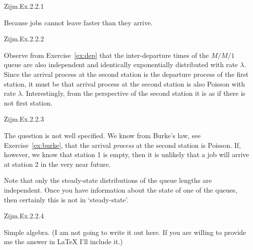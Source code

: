 \begin{exercise}
Zijm.Ex.2.2.1
\begin{solution}
Because jobs cannot leave faster than they arrive.
\end{solution}
\end{exercise}

\begin{exercise}
Zijm.Ex.2.2.2
\begin{solution}
  Observe from Exercise~\ref{ex:dep} that the inter-departure times
  of the $M/M/1$ queue are also independent and identically
  exponentially distributed with rate $\lambda$. Since the arrival
  process at the second station is the departure process of the first
  station, it must be that arrival process at the second station is
  also Poisson with rate $\lambda$.  Interestingly, from the
  perspective of the second station it is as if there is not first
  station.
\end{solution}
\end{exercise}



\begin{exercise}
Zijm.Ex.2.2.3 
\begin{solution}
  The question is not well specified. We know from Burke's law, see Exercise~\ref{ex:burke}, that
  the arrival \emph{process} at the second station is Poisson.  If,
  however, we know that station 1 is empty, then it is unlikely that a
  job will arrive at station 2 in the very near future.

  Note that only the steady-state distributions of the queue lengths
  are independent. Once you have information about the state of one of
  the queues, then certainly this is not in `steady-state'.
\end{solution}
\end{exercise}

\begin{exercise}
Zijm.Ex.2.2.4
\begin{solution}
  Simple algebra.  (I am not going to write it out here. If you are
  willing to provide me the answer in \LaTeX\/ I'll include it.)
\end{solution}
\end{exercise}

